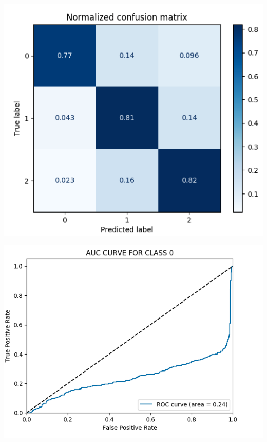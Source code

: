 \documentclass[12pt]{article}
\begin{document}
\begin{multicols*}{2}
\begin{center}
	\includegraphics[scale=0.4]{../screenshot/Non-Overlapping/cf012.png}

	\includegraphics[scale=0.3]{../screenshot/Non-Overlapping/roc_0.png}


\end{center}
\end{multicols*}
\end{document}

